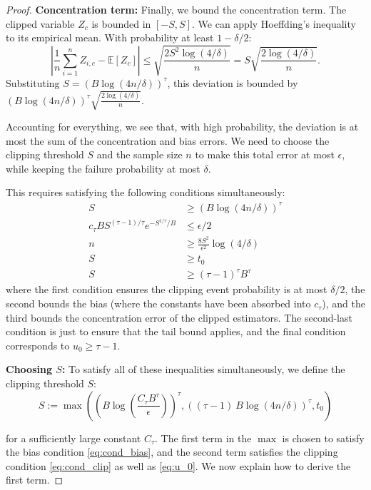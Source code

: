 \documentclass[11pt]{article}
\numberwithin{thm}{section}
\theoremstyle{plain}
\theoremstyle{definition}
\theoremstyle{remark} \newtheorem{remark}[thm]{Remark}
\newcommand{\E}{\mathbb{E}}
\begin{document}
\begin{proof}
\textbf{Concentration term:} Finally, we bound the concentration term. The clipped variable $Z_c$ is bounded in $[-S, S]$. We can apply Hoeffding's inequality to its empirical mean. With probability at least $1-\delta/2$:
\[
\left|\frac{1}{n}\sum_{i=1}^n Z_{i,c} - \E[Z_c]\right| \le \sqrt{\frac{2S^2\log(4/\delta)}{n}} = S\sqrt{\frac{2\log(4/\delta)}{n}}.
\]
Substituting $S = (B \log(4n/\delta))^\tau$, this deviation is bounded by $(B \log(4n/\delta))^\tau \sqrt{\frac{2\log(4/\delta)}{n}}$.

Accounting for everything, we see that, with high probability, the deviation is at most the sum of the concentration and bias errors. We need to choose the clipping threshold $S$ and the sample size $n$ to make this total error at most $\epsilon$, while keeping the failure probability at most $\delta$.

This requires satisfying the following conditions simultaneously: 
\begin{align}
    S &\ge (B \log(4n/\delta))^\tau \label{eq:cond_clip} \\
    c_\tau B S^{(\tau-1)/\tau} e^{-S^{1/\tau}/B} &\le \epsilon/2 \label{eq:cond_bias} \\
    n &\ge \frac{8 S^2}{\epsilon^2} \log(4/\delta) \label{eq:cond_conc}\\
	S &\ge t_0\\
    S &\ge (\tau-1)^{\tau} B^{\tau} \label{eq:u_0}
\end{align}
where the first condition ensures the clipping event probability is at most $\delta/2$, the second bounds the bias (where the constants have been absorbed into $c_\tau$), and the third bounds the concentration error of the clipped estimators. The second-last condition is just to ensure that the tail bound applies, and the final condition corresponds to $u_0 \geq \tau-1$. 

\textbf{Choosing $S$:} To satisfy all of these inequalities simultaneously, we define the clipping threshold $S$:
\[
S := \max\left( \left(B \log\left(\frac{C_\tau B^\tau}{\epsilon}\right)\right)^\tau, \left((\tau-1) ~B \log(4n/\delta)\right)^\tau, t_0 \right)
\]

for a sufficiently large constant $C_\tau$. The first term in the $\max$ is chosen to satisfy the bias condition \eqref{eq:cond_bias}, and the second term satisfies the clipping condition \eqref{eq:cond_clip} as well as \eqref{eq:u_0}. 
We now explain how to derive the first term.


\end{proof}
\end{document}
